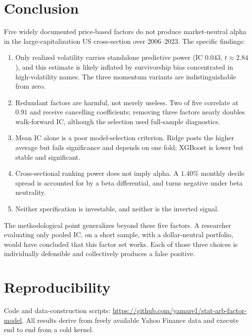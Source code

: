 \documentclass[11pt]{article}
\begin{document}
\section{Conclusion}

Five widely documented price-based factors do not produce market-neutral alpha
in the large-capitalization US cross-section over 2006--2023. The specific
findings:

\begin{enumerate}
\item Only realized volatility carries standalone predictive power
(IC $0.043$, $t \approx 2.84$), and this estimate is likely inflated by
survivorship bias concentrated in high-volatility names. The three momentum
variants are indistinguishable from zero.
\item Redundant factors are harmful, not merely useless. Two of five correlate
at $0.91$ and receive cancelling coefficients; removing three factors nearly
doubles walk-forward IC, although the selection used full-sample diagnostics.
\item Mean IC alone is a poor model-selection criterion. Ridge posts the higher
average but fails significance and depends on one fold; XGBoost is lower but
stable and significant.
\item Cross-sectional ranking power does not imply alpha. A $1.40\%$ monthly
decile spread is accounted for by a beta differential, and turns negative under
beta neutrality.
\item Neither specification is investable, and neither is the inverted signal.
\end{enumerate}

The methodological point generalizes beyond these five factors. A researcher
evaluating only pooled IC, on a short sample, with a dollar-neutral portfolio,
would have concluded that this factor set works. Each of those three choices is
individually defensible and collectively produces a false positive.

\section*{Reproducibility}

Code and data-construction scripts:
\url{https://github.com/yamare1/stat-arb-factor-model}.
All results derive from freely available Yahoo Finance data and execute end to
end from a cold kernel.
\end{document}
